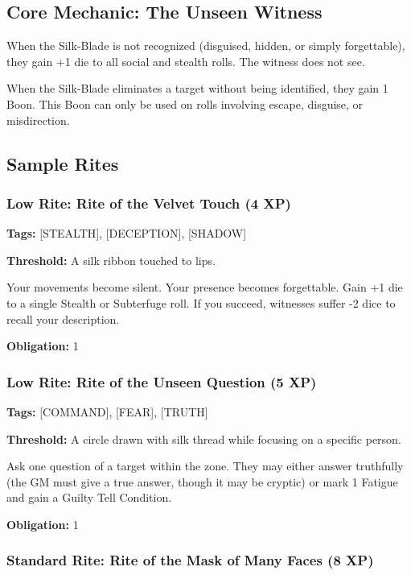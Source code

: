 \subsection{Core Mechanic: The Unseen Witness}

When the Silk-Blade is not recognized (disguised, hidden, or simply forgettable), they gain +1 die to all social and stealth rolls. The witness does not see.

When the Silk-Blade eliminates a target without being identified, they gain 1 Boon. This Boon can only be used on rolls involving escape, disguise, or misdirection.

\subsection{Sample Rites}

\subsubsection{Low Rite: Rite of the Velvet Touch (4 XP)}

\textbf{Tags:} [STEALTH], [DECEPTION], [SHADOW]

\textbf{Threshold:} A silk ribbon touched to lips.

Your movements become silent. Your presence becomes forgettable. Gain +1 die to a single Stealth or Subterfuge roll. If you succeed, witnesses suffer -2 dice to recall your description.

\textbf{Obligation:} 1

\subsubsection{Low Rite: Rite of the Unseen Question (5 XP)}

\textbf{Tags:} [COMMAND], [FEAR], [TRUTH]

\textbf{Threshold:} A circle drawn with silk thread while focusing on a specific person.

Ask one question of a target within the zone. They may either answer truthfully (the GM must give a true answer, though it may be cryptic) or mark 1 Fatigue and gain a Guilty Tell Condition.

\textbf{Obligation:} 1

\subsubsection{Standard Rite: Rite of the Mask of Many Faces (8 XP)}

